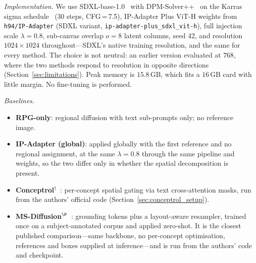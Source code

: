 \documentclass[10pt,twocolumn,letterpaper]{article}
\begin{document}
\noindent\textit{Implementation.}
We use SDXL-base-1.0~\cite{podell2024sdxl} with
DPM-Solver++~\cite{lu2022dpmsolver} on the Karras sigma
schedule~\cite{karras2022elucidating}
(30 steps, CFG\,=\,7.5), IP-Adapter Plus ViT-H weights from
\texttt{h94/IP-Adapter} (SDXL variant, \texttt{ip-adapter-plus\_sdxl\_vit-h}),
full injection scale $\lambda=0.8$, sub-canvas overlap $o=8$ latent columns,
seed 42, and resolution $1024\!\times\!1024$ throughout---SDXL's native
training resolution, and the same for every method.  The choice is not
neutral: an earlier version evaluated at $768$, where the two methods respond
to resolution in opposite directions (Section~\ref{sec:limitations}).  Peak
memory is $15.8$\,GB, which fits a $16$\,GB card with little margin.  No
fine-tuning is performed.

\noindent\textit{Baselines.}
\begin{itemize}\setlength\itemsep{2pt}
\item \textbf{RPG-only}: regional diffusion with text sub-prompts
      only; no reference image.
\item \textbf{IP-Adapter (global)}: applied globally with the first
      reference and no regional assignment, at the same $\lambda{=}0.8$
      through the same pipeline and weights, so the two differ only in
      whether the spatial decomposition is present.
\item \textbf{Conceptrol}$^{\dagger}$~\cite{he2025conceptrol}: per-concept
      spatial gating via text cross-attention masks, run from the authors'
      official code (Section~\ref{sec:conceptrol_setup}).
\item \textbf{MS-Diffusion}$^{\P}$~\cite{wang2025msdiffusion}: grounding
      tokens plus a layout-aware resampler, trained once on a
      subject-annotated corpus and applied zero-shot.  It is the closest
      published comparison---same backbone, no per-concept optimisation,
      references and boxes supplied at inference---and is run from the
      authors' code and checkpoint.
\end{itemize}
\end{document}
